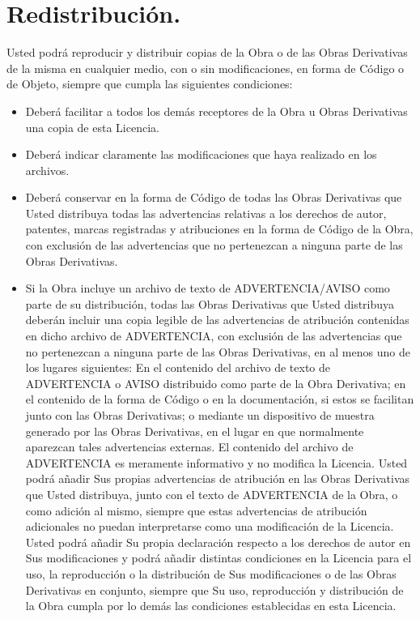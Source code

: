 \section{Redistribución.}Usted podrá reproducir y distribuir copias de la Obra o de las Obras Derivativas de la misma en cualquier medio, con o sin modificaciones, en forma de Código o de Objeto, siempre que cumpla las siguientes condiciones:
\begin{itemize}
	\item Deberá facilitar a todos los demás receptores de la Obra u Obras Derivativas una copia de esta Licencia.
	\item Deberá indicar claramente las modificaciones que haya realizado en los archivos.
	\item Deberá conservar en la forma de Código de todas las Obras Derivativas que Usted distribuya todas las advertencias relativas a los derechos de autor, patentes, marcas registradas y atribuciones en la forma de Código de la Obra, con exclusión de las advertencias que no pertenezcan a ninguna parte de las Obras Derivativas.
	\item Si la Obra incluye un archivo de texto de ADVERTENCIA/AVISO como parte de su distribución, todas las Obras Derivativas que Usted distribuya deberán incluir una copia legible de las advertencias de atribución contenidas en dicho archivo de ADVERTENCIA, con exclusión de las advertencias que no pertenezcan a ninguna parte de las Obras Derivativas, en al menos uno de los lugares siguientes: En el contenido del archivo de texto de ADVERTENCIA o AVISO distribuido como parte de la Obra Derivativa; en el contenido de la forma de Código o en la documentación, si estos se facilitan junto con las Obras Derivativas; o mediante un dispositivo de muestra generado por las Obras Derivativas, en el lugar en que normalmente aparezcan tales advertencias externas. El contenido del archivo de ADVERTENCIA es meramente informativo y no modifica la Licencia. Usted podrá añadir Sus propias advertencias de atribución en las Obras Derivativas que Usted distribuya, junto con el texto de ADVERTENCIA de la Obra, o como adición al mismo, siempre que estas advertencias de atribución adicionales no puedan interpretarse como una modificación de la Licencia. Usted podrá añadir Su propia declaración respecto a los derechos de autor en Sus modificaciones y podrá añadir distintas condiciones en la Licencia para el uso, la reproducción o la distribución de Sus modificaciones o de las Obras Derivativas en conjunto, siempre que Su uso, reproducción y distribución de la Obra cumpla por lo demás las condiciones establecidas en esta Licencia.
\end{itemize}
